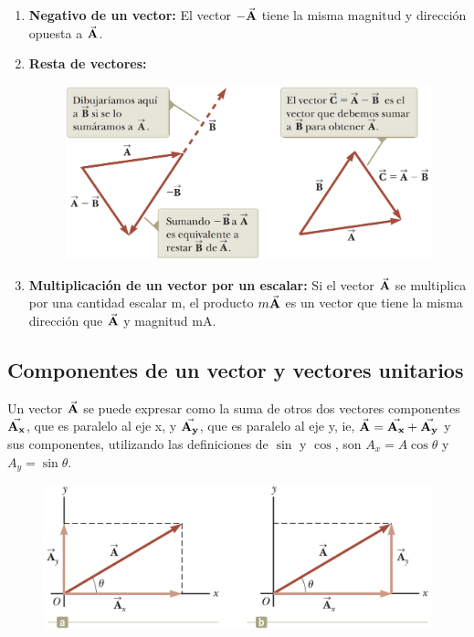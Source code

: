 \begin{enumerate}
\begin{figure}[H]
          \endminipage
        \end{figure}
      \item \textbf{Negativo de un vector:} El vector $-\vec{\mathbf{A}}$ tiene la misma magnitud y dirección opuesta a $\vec{\mathbf{A}}$.
      \item \textbf{Resta de vectores:}
        \begin{figure}[H]
          \centering
          \includegraphics[scale=0.25]{1/graphics_3/figure_2}
        \end{figure}
      \item \textbf{Multiplicación de un vector por un escalar:} Si el vector $\vec{\mathbf{A}}$ se multiplica por una cantidad
      escalar m, el producto $m\vec{\mathbf{A}}$ es un vector que tiene la misma dirección que $\vec{\mathbf{A}}$ y magnitud mA.
    \end{enumerate}

  \subsection{Componentes de un vector y vectores unitarios}
    \PN Un vector $\vec{\mathbf{A}}$ se puede expresar como la suma de otros dos vectores componentes $\vec{\mathbf{A_{x}}}$, que es
    paralelo al eje x, y $\vec{\mathbf{A_{y}}}$, que es paralelo al eje y, ie, $\vec{\mathbf{A}} = \vec{\mathbf{A_{x}}} + \vec{\mathbf{A_{y}}}$ y sus
    componentes, utilizando las definiciones de $\sin$ y $\cos$, son $A_{x} = A \cos \theta$ y $A_{y} = \sin \theta$.

    \begin{figure}[H]
      \centering
      \includegraphics[scale=0.3]{1/graphics_3/figure_3}
    \end{figure}

